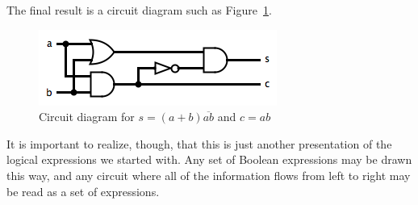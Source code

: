 The final result is a circuit diagram such as Figure~\ref{fig:exprcircuit}.
\begin{figure}
\begin{center}
\includegraphics[width=!,height=!,scale=0.75]{graphics/HalfAdder.png}
\end{center}
\caption{Circuit diagram for $s=(a+b)\overline{ab}$ and $c=ab$}
\label{fig:exprcircuit}
\end{figure}

It is important to realize, though, that this is just another presentation of the logical expressions we started with. Any set of Boolean expressions may be drawn this way, and any circuit where all of the information flows from left to right may be read as a set of expressions.


